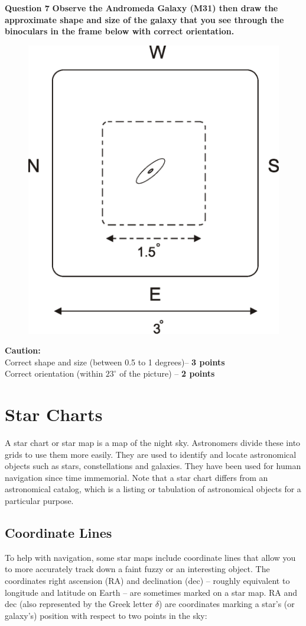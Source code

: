 \documentclass[a4paper,12pt]{extarticle}
\begin{document}
\textsf{\textbf{Question 7}} \textbf{Observe the Andromeda Galaxy (M31) then draw the approximate shape and size of the galaxy that you see through the binoculars in the frame below with correct orientation.}
\begin{figure}[H]
	\centering
	\includegraphics[width=0.4\linewidth]{andromedasize.eps}
\end{figure}
\textbf{Caution:}\\
{\color{red} Correct shape and size (between 0.5 to 1 degrees)-- \textbf{3 points}\\
Correct orientation (within $23^\circ$ of the picture) -- \textbf{ 2 points}}


\clearpage



\section{Star Charts}

A star chart or star map is a map of the night sky. Astronomers divide these into grids to use them more easily. They are used to identify and locate astronomical objects such as stars, constellations and galaxies. They have been used for human navigation since time immemorial. Note that a star chart differs from an astronomical catalog, which is a listing or tabulation of astronomical objects for a particular purpose. 

\subsection{Coordinate Lines}

To help with navigation, some star maps include coordinate lines that allow you to more accurately track down a faint fuzzy or an interesting object. The coordinates right ascension (RA) and declination (dec) – roughly equivalent to longitude and latitude on Earth – are sometimes marked on a star map. RA and dec (also represented by the Greek letter $\delta$) are coordinates marking a star’s (or galaxy’s) position with respect to two points in the sky:
\end{document}
